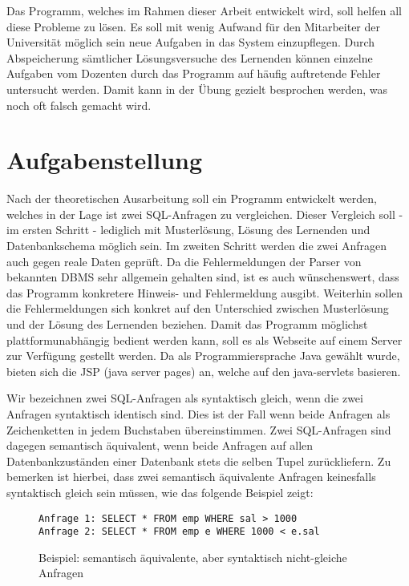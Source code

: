 Das Programm, welches im Rahmen dieser Arbeit entwickelt wird, soll helfen all diese Probleme zu lösen. Es soll mit wenig Aufwand für den Mitarbeiter der Universität möglich sein neue Aufgaben in das System einzupflegen. Durch Abspeicherung sämtlicher Lösungsversuche des Lernenden können einzelne Aufgaben vom Dozenten durch das Programm auf häufig auftretende Fehler untersucht werden. Damit kann in der Übung gezielt besprochen werden, was noch oft falsch gemacht wird.

\section{Aufgabenstellung}

Nach der theoretischen Ausarbeitung soll ein Programm entwickelt werden, welches in der Lage ist zwei SQL-Anfragen zu vergleichen. Dieser Vergleich soll - im ersten Schritt - lediglich mit Musterlösung, Lösung des Lernenden und Datenbankschema möglich sein. Im zweiten Schritt werden die zwei Anfragen auch gegen reale Daten geprüft. Da die Fehlermeldungen der Parser von bekannten DBMS sehr allgemein gehalten sind, ist es auch wünschenswert, dass das Programm konkretere Hinweis- und Fehlermeldung ausgibt. Weiterhin sollen die Fehlermeldungen sich konkret auf den Unterschied zwischen Musterlösung und der Lösung des Lernenden beziehen. Damit das Programm möglichst plattformunabhängig bedient werden kann, soll es als Webseite auf einem Server zur Verfügung gestellt werden. Da als Programmiersprache Java gewählt wurde, bieten sich die JSP (java server pages) an, welche auf den java-servlets basieren.

Wir bezeichnen zwei SQL-Anfragen als syntaktisch gleich, wenn die zwei Anfragen syntaktisch identisch sind. Dies ist der Fall wenn beide Anfragen als Zeichenketten in jedem Buchstaben übereinstimmen. Zwei SQL-Anfragen sind dagegen semantisch äquivalent, wenn beide Anfragen auf allen Datenbankzuständen einer Datenbank stets die selben Tupel zurückliefern. Zu bemerken ist hierbei, dass zwei semantisch äquivalente Anfragen keinesfalls syntaktisch gleich sein müssen, wie das folgende Beispiel zeigt:

\begin{figure}[h]
\begin{verbatim}
Anfrage 1: SELECT * FROM emp WHERE sal > 1000
Anfrage 2: SELECT * FROM emp e WHERE 1000 < e.sal
\end{verbatim}
\caption{Beispiel: semantisch äquivalente, aber syntaktisch nicht-gleiche Anfragen}
\end{figure}

